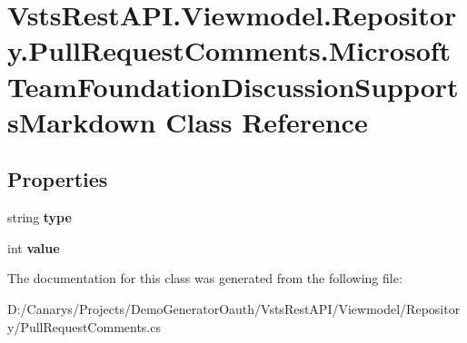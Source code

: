 \hypertarget{class_vsts_rest_a_p_i_1_1_viewmodel_1_1_repository_1_1_pull_request_comments_1_1_microsoft_team_cdef9adbd80bdee012c89b0dd9ec0a8e}{}\section{Vsts\+Rest\+A\+P\+I.\+Viewmodel.\+Repository.\+Pull\+Request\+Comments.\+Microsoft\+Team\+Foundation\+Discussion\+Supports\+Markdown Class Reference}
\label{class_vsts_rest_a_p_i_1_1_viewmodel_1_1_repository_1_1_pull_request_comments_1_1_microsoft_team_cdef9adbd80bdee012c89b0dd9ec0a8e}
\subsection*{Properties}
\begin{DoxyCompactItemize}
\item 
\mbox{\label{class_vsts_rest_a_p_i_1_1_viewmodel_1_1_repository_1_1_pull_request_comments_1_1_microsoft_team_cdef9adbd80bdee012c89b0dd9ec0a8e_a3113af4d25ebe888d1960826d38532cb}} 
string {\bfseries type}
\item 
\mbox{\label{class_vsts_rest_a_p_i_1_1_viewmodel_1_1_repository_1_1_pull_request_comments_1_1_microsoft_team_cdef9adbd80bdee012c89b0dd9ec0a8e_a37f4f8fd1bb3e4968cfcd6dcf3d9674b}} 
int {\bfseries value}
\end{DoxyCompactItemize}


The documentation for this class was generated from the following file\+:\begin{DoxyCompactItemize}
\item 
D\+:/\+Canarys/\+Projects/\+Demo\+Generator\+Oauth/\+Vsts\+Rest\+A\+P\+I/\+Viewmodel/\+Repository/Pull\+Request\+Comments.\+cs\end{DoxyCompactItemize}
